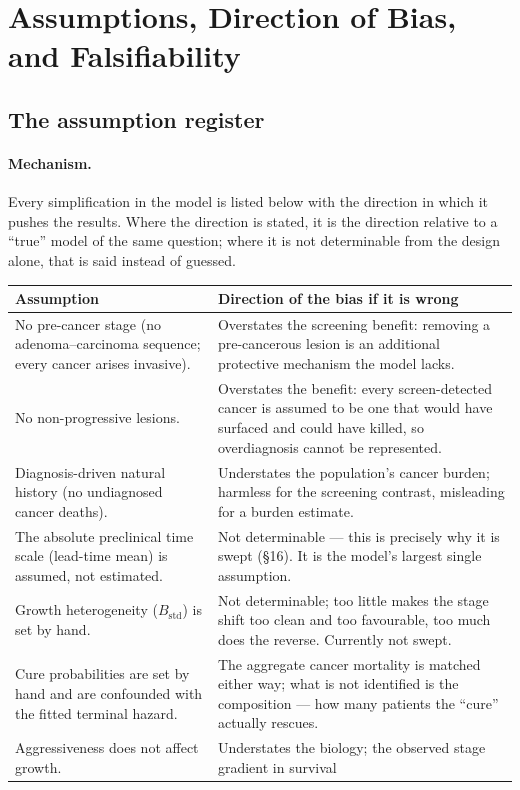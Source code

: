 \documentclass[12pt,a4paper]{article}
\newcommand{\mech}[1]{\paragraph{Mechanism.} #1}
\begin{document}
\section{Assumptions, Direction of Bias, and Falsifiability}
\label{sec:assumptions}

\subsection{The assumption register}

\mech{Every simplification in the model is listed below with the direction in which it pushes the results.
Where the direction is stated, it is the direction relative to a ``true'' model of the same question; where
it is not determinable from the design alone, that is said instead of guessed.

\begin{center}
\footnotesize
\begin{tabular}{@{}p{8.0cm}p{7.6cm}@{}}
\toprule
\textbf{Assumption} & \textbf{Direction of the bias if it is wrong} \\
\midrule
No pre-cancer stage (no adenoma--carcinoma sequence; every cancer arises invasive). & Overstates the
screening benefit: removing a pre-cancerous lesion is an additional protective mechanism the model lacks. \\
No non-progressive lesions. & Overstates the benefit: every screen-detected cancer is assumed to be one
that would have surfaced and could have killed, so overdiagnosis cannot be represented. \\
Diagnosis-driven natural history (no undiagnosed cancer deaths). & Understates the population's cancer
burden; harmless for the screening contrast, misleading for a burden estimate. \\
The absolute preclinical time scale (lead-time mean) is assumed, not estimated. & Not determinable --- this
is precisely why it is swept (\S16). It is the model's largest single assumption. \\
Growth heterogeneity ($B_{\text{std}}$) is set by hand. & Not determinable; too little makes the stage shift
too clean and too favourable, too much does the reverse. Currently not swept. \\
Cure probabilities are set by hand and are confounded with the fitted terminal hazard. & The aggregate
cancer mortality is matched either way; what is not identified is the composition --- how many patients the
``cure'' actually rescues. \\
Aggressiveness does not affect growth. & Understates the biology; the observed stage gradient in survival

\end{tabular}
\end{center}}
\end{document}
